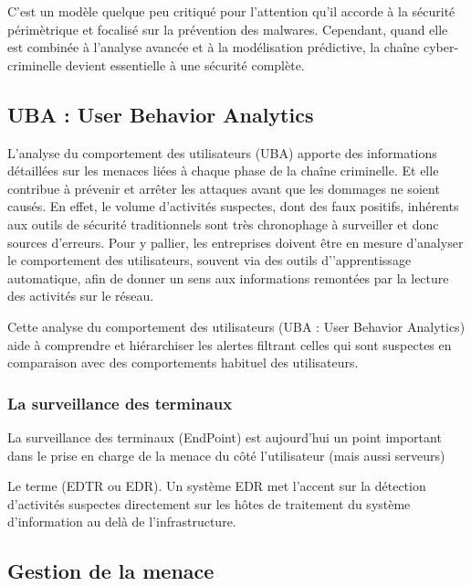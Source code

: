 C’est un modèle quelque peu critiqué pour l’attention qu’il accorde à la sécurité  périmètrique et focalisé sur la prévention des malwares. Cependant, quand elle est combinée à l’analyse avancée et à la modélisation prédictive, la chaîne cyber-criminelle devient essentielle à une sécurité complète.

\subsection{UBA : User Behavior Analytics}


L’analyse du comportement des utilisateurs (UBA) apporte des informations détaillées sur les menaces liées à chaque phase de la chaîne criminelle. Et elle contribue à prévenir et arrêter les attaques avant que les dommages ne soient causés. En effet, le volume d’activités suspectes, dont des faux positifs, inhérents aux outils de sécurité traditionnels sont très chronophage à surveiller et donc sources d’erreurs.
Pour y pallier, les entreprises doivent être en mesure d’analyser le comportement des utilisateurs, souvent via des outils d'’apprentissage automatique, afin de donner un sens aux informations remontées par la lecture des activités sur le réseau.

Cette analyse du comportement des utilisateurs (UBA : User Behavior Analytics) aide à  comprendre et hiérarchiser les alertes filtrant celles qui sont suspectes en comparaison avec des comportements habituel des utilisateurs.

\subsubsection{La surveillance des terminaux}

La surveillance des terminaux (EndPoint) est aujourd'hui un point important dans le prise en charge de la menace du côté l'utilisateur (mais aussi serveurs)

 Le  terme  (EDTR ou EDR). Un système EDR met  l’accent sur la détection d’activités suspectes directement sur les hôtes de traitement du système d'information au delà de l'infrastructure. 


\subsection{Gestion de la menace}

